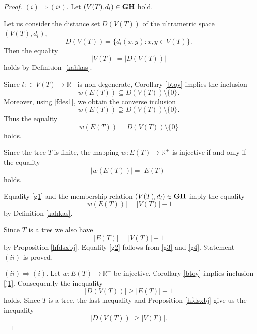 \documentclass[pdflatex,sn-mathphys-num]{sn-jnl}%
\theoremstyle{thmstyleone}%
\theoremstyle{thmstyletwo}%
\theoremstyle{thmstylethree}%
\theoremstyle{thmstyletwo}%
\theoremstyle{thmstylethree}%
\begin{document}
\begin{proof}
$(i) \Rightarrow (ii)$. Let $(V(T), d_l) \in {\bf GH}$ hold.

Let us consider the distance set $D(V(T))$ of the ultrametric space $(V(T), d_l)$,
\[
D(V(T)) = \{ d_l(x,y) : x,y \in V(T) \}.
\]
Then the equality
\[
|V(T)| = |D(V(T))|
\]
holds by Definition~\ref{kahkas}.



Since $l: \in V(T) \to \mathbb R^+$ is non-degenerate, Corollary \ref{btoy} implies the inclusion 
\begin{equation}\label{j1}
w(E(T)) \subseteq D(V(T))\setminus\{0\}.
\end{equation}
Moreover, using \eqref{fdes1}, we obtain
the converse inclusion
\[
w(E(T)) \supseteq D(V(T)) \setminus \{0\}.
\]
Thus the equality
\begin{equation}
    \label{g1}
w(E(T)) = D(V(T)) \setminus \{0\}
\end{equation}
holds.

Since the tree $T$ is finite, the mapping 
$w : E(T) \to \mathbb{R}^+$
is injective if and only if the equality
\begin{equation}
    \label{g2}
|w(E(T))| = |E(T)|
\end{equation}
holds.

Equality \eqref{g1} and the membership relation 
$(V(T), d_l) \in {\bf GH}$ imply the equality
\begin{equation}
    \label{g3}
|w(E(T))| = |V(T)| - 1
\end{equation}
by Definition \ref{kahkas}.

Since $T$ is a tree we also have
\begin{equation}
    \label{g4}
    |E(T)| = |V(T)| - 1 
\end{equation}
by Proposition \ref{hfdsxbj}. Equality \eqref{g2} follows from \eqref{g3} and \eqref{g4}. Statement $(ii)$ is proved.









$(ii) \Rightarrow (i)$. 
Let $w : E(T) \to \mathbb{R}^+$ be injective. Corollary \ref{btoy} implies  inclusion \eqref{j1}.
Consequently the inequality
\[
|D(V(T))| \ge |E(T)| + 1
\]
holds.
Since $T$ is a tree, the last inequality and Proposition \ref{hfdsxbj} give us the inequality
\begin{equation}
    \label{kam1}
|D(V(T))| \ge |V(T)|.
\end{equation}


\end{proof}
\end{document}
